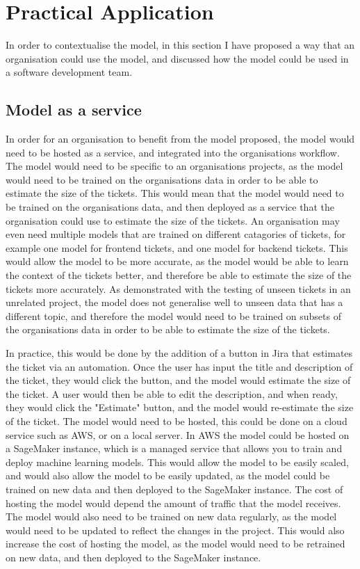 \documentclass{UoYCSproject}
\begin{document}
    \chapter{Practical Application}
    \label{ch:practical-application}

    In order to contextualise the model, in this section I have proposed a way that an organisation could use the model, and discussed how the model could be used in a software development team.
    \section[Model as a service]{Model as a service}

In order for an organisation to benefit from the model proposed, the model would need to be hosted as a service, and integrated into the organisations workflow. The model would need to be specific to an organisations projects, as the model would need to be trained on the organisations data in order to be able to estimate the size of the tickets. This would mean that the model would need to be trained on the organisations data, and then deployed as a service that the organisation could use to estimate the size of the tickets. An organisation may even need multiple models that are trained on different catagories of tickets, for example one model for frontend tickets, and one model for backend tickets. This would allow the model to be more accurate, as the model would be able to learn the context of the tickets better, and therefore be able to estimate the size of the tickets more accurately. As demonstrated with the testing of unseen tickets in an unrelated project, the model does not generalise well to unseen data that has a different topic, and therefore the model would need to be trained on subsets of the organisations data in order to be able to estimate the size of the tickets.

    In practice, this would be done by the addition of a button in Jira that estimates the ticket via an automation.
Once the user has input the title and description of the ticket, they would click the button, and the model would estimate the size of the ticket. A user would then be able to edit the description, and when ready, they would click the "Estimate" button, and the model would re-estimate the size of the ticket.
    The model would need to be hosted, this could be done on a cloud service such as AWS, or on a local server. In AWS the model could be hosted on a SageMaker instance, which is a managed service that allows you to train and deploy machine learning models. This would allow the model to be easily scaled, and would also allow the model to be easily updated, as the model could be trained on new data and then deployed to the SageMaker instance.
The cost of hosting the model would depend the amount of traffic that the model receives.
    The model would also need to be trained on new data regularly, as the model would need to be updated to reflect the changes in the project. This would also increase the cost of hosting the model, as the model would need to be retrained on new data, and then deployed to the SageMaker instance.
\end{document}
